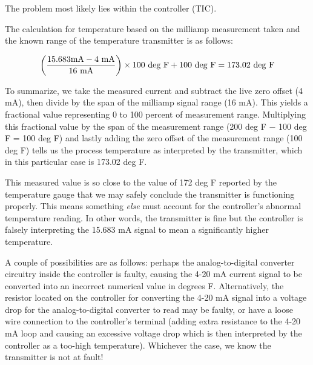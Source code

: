 












The problem most likely lies within the controller (TIC).

\vskip 10pt

The calculation for temperature based on the milliamp measurement taken and the known range of the temperature transmitter is as follows:

$$\left({15.683 \hbox{mA} - 4 \hbox{ mA}} \over 16 \hbox{ mA}\right) \times 100 \hbox{ deg F} + 100 \hbox{ deg F} = 173.02 \hbox{ deg F}$$

To summarize, we take the measured current and subtract the live zero offset (4 mA), then divide by the span of the milliamp signal range (16 mA).  This yields a fractional value representing 0 to 100 percent of measurement range.  Multiplying this fractional value by the span of the measurement range (200 deg F $-$ 100 deg F = 100 deg F) and lastly adding the zero offset of the measurement range (100 deg F) tells us the process temperature as interpreted by the transmitter, which in this particular case is 173.02 deg F.

This measured value is so close to the value of 172 deg F reported by the temperature gauge that we may safely conclude the transmitter is functioning properly.  This means something {\it else} must account for the controller's abnormal temperature reading.  In other words, the transmitter is fine but the controller is falsely interpreting the 15.683 mA signal to mean a significantly higher temperature.

A couple of possibilities are as follows: perhaps the analog-to-digital converter circuitry inside the controller is faulty, causing the 4-20 mA current signal to be converted into an incorrect numerical value in degrees F.  Alternatively, the resistor located on the controller for converting the 4-20 mA signal into a voltage drop for the analog-to-digital converter to read may be faulty, or have a loose wire connection to the controller's terminal (adding extra resistance to the 4-20 mA loop and causing an excessive voltage drop which is then interpreted by the controller as a too-high temperature).  Whichever the case, we know the transmitter is not at fault!




